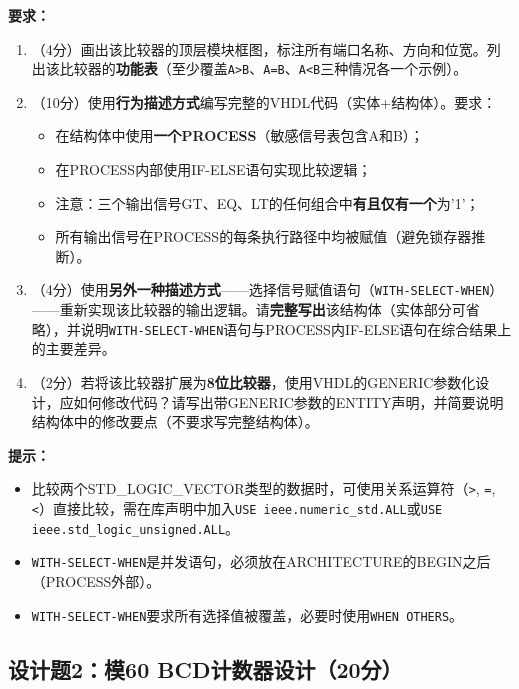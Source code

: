 \vspace{0.3cm}

\textbf{要求：}
\begin{enumerate}[label=(\arabic*)]
  \item （4分）画出该比较器的顶层模块框图，标注所有端口名称、方向和位宽。列出该比较器的\textbf{功能表}（至少覆盖\texttt{A>B}、\texttt{A=B}、\texttt{A<B}三种情况各一个示例）。
  \item （10分）使用\textbf{行为描述方式}编写完整的VHDL代码（实体+结构体）。要求：
  \begin{itemize}
    \item 在结构体中使用\textbf{一个PROCESS}（敏感信号表包含A和B）；
    \item 在PROCESS内部使用IF-ELSE语句实现比较逻辑；
    \item 注意：三个输出信号GT、EQ、LT的任何组合中\textbf{有且仅有一个}为'1'；
    \item 所有输出信号在PROCESS的每条执行路径中均被赋值（避免锁存器推断）。
  \end{itemize}
  \item （4分）使用\textbf{另外一种描述方式}——选择信号赋值语句（\texttt{WITH-SELECT-WHEN}）——重新实现该比较器的输出逻辑。请\textbf{完整写出}该结构体（实体部分可省略），并说明\texttt{WITH-SELECT-WHEN}语句与PROCESS内IF-ELSE语句在综合结果上的主要差异。
  \item （2分）若将该比较器扩展为\textbf{8位比较器}，使用VHDL的GENERIC参数化设计，应如何修改代码？请写出带GENERIC参数的ENTITY声明，并简要说明结构体中的修改要点（不要求写完整结构体）。
\end{enumerate}

\begin{framed}
\textbf{提示：}
\begin{itemize}
  \item 比较两个STD\_LOGIC\_VECTOR类型的数据时，可使用关系运算符（\texttt{>}, \texttt{=}, \texttt{<}）直接比较，需在库声明中加入\texttt{USE ieee.numeric\_std.ALL}或\texttt{USE ieee.std\_logic\_unsigned.ALL}。
  \item \texttt{WITH-SELECT-WHEN}是并发语句，必须放在ARCHITECTURE的BEGIN之后（PROCESS外部）。
  \item \texttt{WITH-SELECT-WHEN}要求所有选择值被覆盖，必要时使用\texttt{WHEN OTHERS}。
\end{itemize}
\end{framed}

\newpage

\subsection*{设计题2：模60 BCD计数器设计（20分）}

